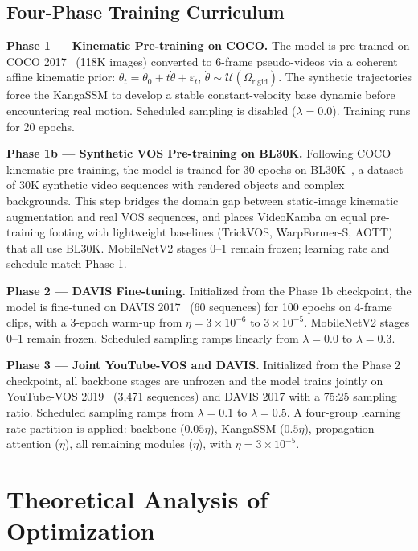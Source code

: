 \documentclass[sigconf]{acmart}
\begin{document}
\subsection{Four-Phase Training Curriculum}
\label{sec:curriculum}

\textbf{Phase 1 — Kinematic Pre-training on COCO.} The model is pre-trained on COCO 2017~\cite{lin2014coco} (118K images) converted to 6-frame pseudo-videos via a coherent affine kinematic prior: $\theta_t = \theta_0 + t\dot{\theta} + \varepsilon_t$, $\dot{\theta} \sim \mathcal{U}(\Omega_\text{rigid})$. The synthetic trajectories force the KangaSSM to develop a stable constant-velocity base dynamic before encountering real motion. Scheduled sampling is disabled ($\lambda=0.0$). Training runs for 20 epochs.

\textbf{Phase 1b — Synthetic VOS Pre-training on BL30K.} Following COCO kinematic pre-training, the model is trained for 30 epochs on BL30K~\cite{cheng2021modular}, a dataset of 30K synthetic video sequences with rendered objects and complex backgrounds. This step bridges the domain gap between static-image kinematic augmentation and real VOS sequences, and places VideoKamba on equal pre-training footing with lightweight baselines (TrickVOS, WarpFormer-S, AOTT) that all use BL30K. MobileNetV2 stages 0--1 remain frozen; learning rate and schedule match Phase 1.

\textbf{Phase 2 — DAVIS Fine-tuning.} Initialized from the Phase 1b checkpoint, the model is fine-tuned on DAVIS 2017~\cite{pont20172017} (60 sequences) for 100 epochs on 4-frame clips, with a 3-epoch warm-up from $\eta=3\times10^{-6}$ to $3\times10^{-5}$. MobileNetV2 stages 0--1 remain frozen. Scheduled sampling ramps linearly from $\lambda=0.0$ to $\lambda=0.3$.

\textbf{Phase 3 — Joint YouTube-VOS and DAVIS.} Initialized from the Phase 2 checkpoint, all backbone stages are unfrozen and the model trains jointly on YouTube-VOS 2019~\cite{xu2018ytbvos} (3,471 sequences) and DAVIS 2017 with a 75:25 sampling ratio. Scheduled sampling ramps from $\lambda=0.1$ to $\lambda=0.5$. A four-group learning rate partition is applied: backbone ($0.05\eta$), KangaSSM ($0.5\eta$), propagation attention ($\eta$), all remaining modules ($\eta$), with $\eta=3\times10^{-5}$.

\section{Theoretical Analysis of Optimization}
\label{sec:theory}
\end{document}
